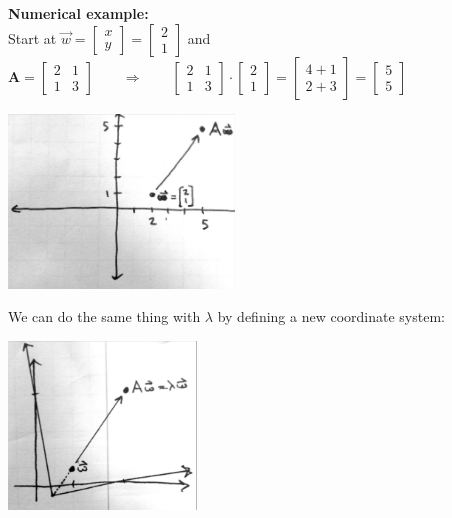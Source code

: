 \documentclass{article}
\newcommand{\ind}{\-\hspace{1cm}}
\begin{document}
\textbf{Numerical example:}\\
\ind Start at $\vec{w}=\begin{bmatrix} x \\ y \end{bmatrix}=\begin{bmatrix}2 \\ 1 \end{bmatrix} $ and $\mathbf{A} = \begin{bmatrix} 2 & 1 \\ 1 & 3 \end{bmatrix} \qquad  \Rightarrow   \qquad\begin{bmatrix} 2 & 1 \\ 1 & 3 \end{bmatrix} \cdot \begin{bmatrix}2 \\ 1 \end{bmatrix}  = \begin{bmatrix} 4+1 \\ 2+3 \end{bmatrix} =\begin{bmatrix}5 \\ 5 \end{bmatrix}$ 
\begin{center}
	\includegraphics[width=6cm]{figs/eigen2.pdf}
\end{center}
We can do the same thing with $\lambda$ by defining a new coordinate system:
\begin{center}
	\includegraphics[width=5cm]{figs/eigen3.pdf}
\end{center}
\end{document}
